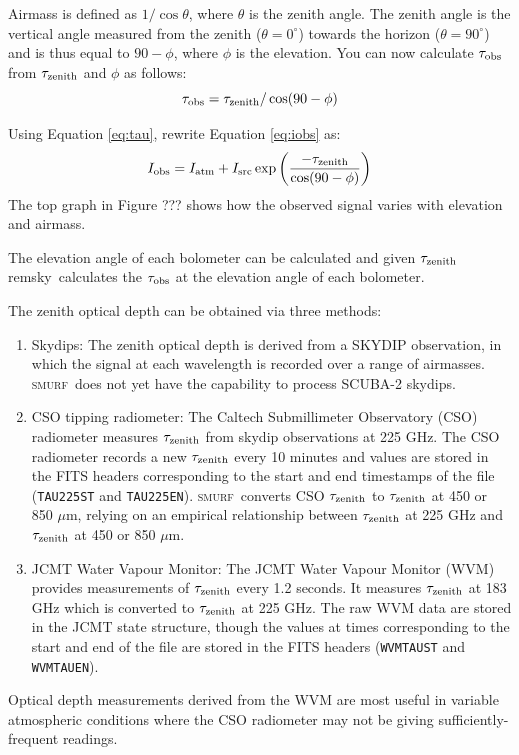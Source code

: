 \documentclass[twoside,11pt]{article}
\newcommand{\xref}[3]{#1}
\renewcommand{\_}{\texttt{\symbol{95}}}
\newcommand{\SMURF}{\textsc{smurf}}
\newcommand{\task}[1]{\textsf{#1}}
\newcommand{\remsky}{\xref{\task{remsky}}{sun258}{REMSKY}}
\begin{document}
Airmass is defined as $1 / \cos \theta$, where $\theta$ is the zenith
angle. The zenith angle is the vertical angle measured from the zenith
($\theta = 0^\circ$) towards the horizon ($\theta = 90^\circ$) and is
thus equal to $90-\phi$, where $\phi$ is the elevation. You can now
calculate $\tau_{\rm obs}$ from $\tau_{\rm zenith}$ and $\phi$ as
follows:
\begin{equation}
\tau_{\rm obs} = \tau_{\rm zenith} / \cos(90 - \phi )
\label{eq:tau}
\end{equation}


Using Equation \ref{eq:tau}, rewrite Equation \ref{eq:iobs} as:
\begin{equation}
I_{\rm obs} = I_{\rm atm} + I_{\rm src} \exp \left( 
\frac{-\tau_{\rm zenith}}{\cos(90-\phi)}\right)
\end{equation}
The top graph in Figure ??? shows how the observed signal varies with elevation
and airmass.

The elevation angle of each bolometer can be calculated and given
$\tau_{\rm zenith}$ \remsky\ calculates the $\tau_{\rm obs}$ at the
elevation angle of each bolometer. 

The zenith optical depth can be obtained via three methods:
\begin{enumerate}
\item Skydips: The zenith optical depth is derived from a SKYDIP
  observation, in which the signal at each wavelength is recorded over
  a range of airmasses. \SMURF\ does not yet have the capability to
  process SCUBA-2 skydips.

\item CSO tipping radiometer: The Caltech Submillimeter Observatory
  (CSO) radiometer measures $\tau_{\rm zenith}$ from skydip
  observations at 225 GHz. The CSO radiometer records a new $\tau_{\rm
    zenith}$ every 10 minutes and values are stored in the FITS
  headers corresponding to the start and end timestamps of the file
  (\texttt{TAU225ST} and \texttt{TAU225EN}). \SMURF\ converts CSO
  $\tau_{\rm zenith}$ to $\tau_{\rm zenith}$ at 450 or 850 $\mu$m,
  relying on an empirical relationship between $\tau_{\rm zenith}$ at
  225 GHz and $\tau_{\rm zenith}$ at 450 or 850 $\mu$m.

\item JCMT Water Vapour Monitor: The JCMT Water Vapour Monitor (WVM)
  provides measurements of $\tau_{\rm zenith}$ every 1.2 seconds. It
  measures $\tau_{\rm zenith}$ at 183 GHz which is converted to
  $\tau_{\rm zenith}$ at 225 GHz. The raw WVM data are stored in the
  JCMT state structure, though the values at times corresponding to
  the start and end of the file are stored in the FITS headers
  (\texttt{WVMTAUST} and \texttt{WVMTAUEN}).
\end{enumerate}
Optical depth measurements derived from the WVM are most useful in
variable atmospheric conditions where the CSO radiometer may not be
giving sufficiently-frequent readings.
\end{document}
